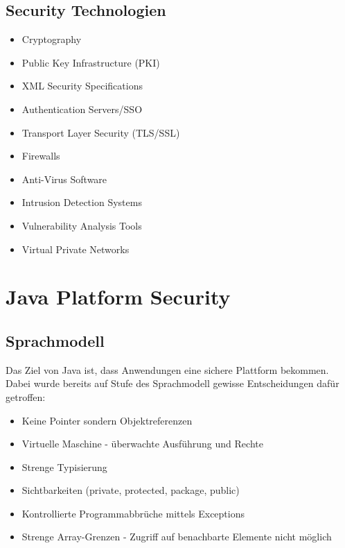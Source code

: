 \subsection{Security Technologien}
\begin{multicols}{2}
\begin{itemize}
	\item Cryptography
	\item Public Key Infrastructure (PKI)
	\item XML Security Specifications
	\item Authentication Servers/SSO
	\item Transport Layer Security (TLS/SSL)
	\item Firewalls
	\item Anti-Virus Software
	\item Intrusion Detection Systems
	\item Vulnerability Analysis Tools
	\item Virtual Private Networks
\end{itemize}
\end{multicols}


\section{Java Platform Security}

\subsection{Sprachmodell}
Das Ziel von Java ist, dass Anwendungen eine sichere Plattform bekommen. Dabei wurde bereits auf Stufe des Sprachmodell gewisse Entscheidungen dafür getroffen:
\begin{itemize}
	\item Keine Pointer sondern Objektreferenzen
	\item Virtuelle Maschine - überwachte Ausführung und Rechte
	\item Strenge Typisierung
	\item Sichtbarkeiten (private, protected, package, public)
	\item Kontrollierte Programmabbrüche mittels Exceptions
	\item Strenge Array-Grenzen - Zugriff auf benachbarte Elemente nicht möglich
\end{itemize}

